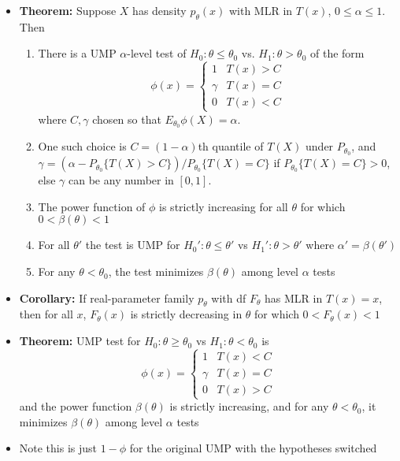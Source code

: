 \documentclass[fontsize=5pt]{scrartcl}
\begin{document}
\begin{multicols}{2}
\begin{itemize}
\item \textbf{Theorem:} Suppose $X$ has density $p_{\theta}(x)$ with
  MLR in $T(x)$, $0\leq\alpha\leq1$. Then
  \begin{enumerate}
  \item There is a UMP $\alpha$-level test of
    $H_{0}:\theta\leq\theta_{0}$ vs. $H_{1}:\theta>\theta_{0}$ of the form
    \begin{equation}
      \phi(x) = \begin{cases}
        1 & T(x) > C \\
        \gamma & T(x) = C \\
        0 & T(x) < C
      \end{cases}
    \end{equation}
    where $C,\gamma$ chosen so that $E_{\theta_{0}}\phi(X) = \alpha$.
  \item One such choice is $C=(1-\alpha)$th quantile of $T(X)$ under
    $P_{\theta_{0}}$, and $\gamma =
    (\alpha-P_{\theta_{0}}\{T(X)>C\})/P_{\theta_{0}}\{T(X) = C\}$ if
    $P_{\theta_{0}}\{T(X)=C\}>0$, else $\gamma$ can be any number in
    $[0,1]$.
  \item The power function of $\phi$ is strictly increasing for all
    $\theta$ for which $0<\beta(\theta)<1$
  \item For all $\theta'$ the test is UMP for
    $H_{0}':\theta\leq\theta'$ vs $H_{1}': \theta>\theta'$ where
    $\alpha'=\beta(\theta')$
  \item For any $\theta<\theta_{0}$, the test minimizes
    $\beta(\theta)$ among level $\alpha$ tests
  \end{enumerate}
\item \textbf{Corollary:} If real-parameter family $p_{\theta}$ with
  df $F_{\theta}$ has MLR in $T(x)=x$, then for all $x$,
  $F_{\theta}(x)$ is strictly decreasing in $\theta$ for which
  $0<F_{\theta}(x)<1$

\item \textbf{Theorem:} UMP test for $H_{0}:\theta\geq\theta_{0}$ vs
  $H_{1}:\theta<\theta_{0}$ is
    \begin{equation}
      \phi(x) = \begin{cases}
        1 & T(x) < C \\
        \gamma & T(x) = C \\
        0 & T(x) > C
      \end{cases}
    \end{equation}
    and the power function $\beta(\theta)$ is strictly increasing, and
    for any $\theta<\theta_{0}$, it minimizes $\beta(\theta)$ among
    level $\alpha$ tests
  \item Note this is just $1-\phi$ for the original UMP with the
    hypotheses switched
\end{itemize}


\end{multicols}
\end{document}
